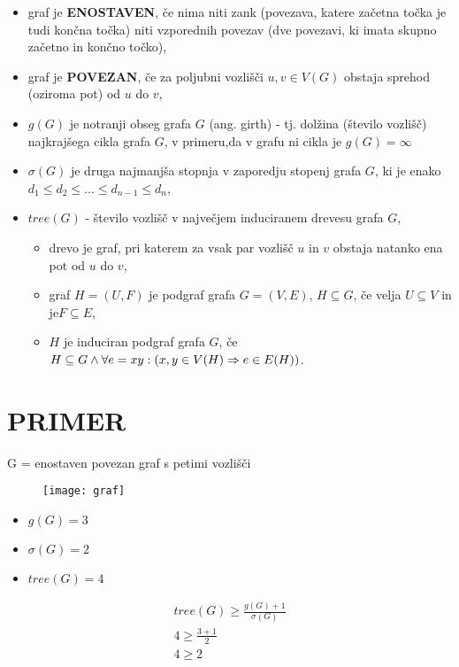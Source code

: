 \documentclass[11pt, a4paper]{article}
\begin{document}
\begin{itemize}
	\item graf je \textbf{ENOSTAVEN}, če nima niti zank (povezava, katere začetna točka je tudi končna točka) niti vzporednih povezav (dve povezavi, ki imata skupno začetno in končno točko),
	\item graf je \textbf{POVEZAN}, če za poljubni vozlišči $u , v \in V(G)$ obstaja sprehod (oziroma pot) od $u$ do $v$,
	\item $g(G)$ je notranji obseg grafa $G$ (ang. girth) - tj. dolžina (število vozlišč) najkrajšega cikla grafa $G$, v primeru,da v grafu ni cikla je $g(G) =\infty $
	\item $\sigma(G)$ je druga najmanjša stopnja v zaporedju stopenj grafa $G$, ki je enako $d_1 \leq d_2 \leq ... \leq d_{n-1} \leq d_n $,
	\item  $tree(G)$  -  število vozlišč v največjem induciranem drevesu grafa $G$,
	\begin{itemize}
		\item drevo je graf, pri katerem za vsak par vozlišč $u$ in $v$ obstaja natanko ena pot od $u$ do $v$,
		\item graf $H = (U, F)$ je podgraf grafa $G = (V, E)$, $H \subseteq G$, če velja $U \subseteq V$ in je$ F \subseteq E$,
		\item $H$ je induciran podgraf grafa $G$, če $H \subseteq G \land \forall e = xy : \\(x , y \in V(H) \Rightarrow e \in E(H))$.
	\end{itemize}
\end{itemize}

\newpage
\section{\textbf{PRIMER}}

\vspace{0,5cm}
G = enostaven povezan graf s petimi vozlišči

\begin{figure}[h]
\texttt{[image: graf]}
\centering
\end{figure}
 
\begin{itemize}
\item $g(G) = 3$
\item $\sigma(G) = 2 $
\item $tree(G) = 4 $
\end{itemize}

\begin{align*}
tree(G) \geq \frac{g(G) + 1}{\sigma(G)} \\
4 \geq \frac{3 + 1}{2} \\
4\geq 2
\end{align*}
\end{document}
